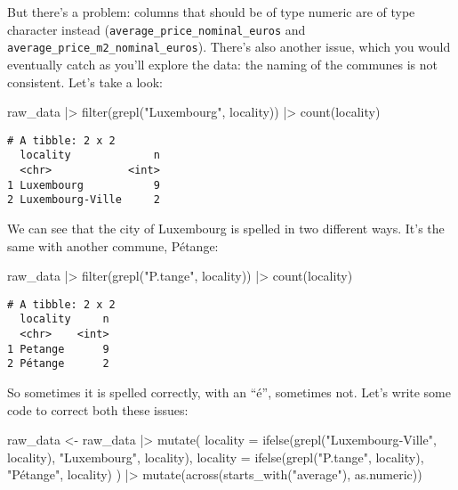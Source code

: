 \documentclass[
  letterpaper,
  DIV=11,
  numbers=noendperiod]{scrartcl}
\newenvironment{Shaded}{\begin{snugshade}}{\end{snugshade}}
\newcommand{\AttributeTok}[1]{\textcolor[rgb]{0.40,0.45,0.13}{#1}}
\newcommand{\FunctionTok}[1]{\textcolor[rgb]{0.28,0.35,0.67}{#1}}
\newcommand{\NormalTok}[1]{\textcolor[rgb]{0.00,0.23,0.31}{#1}}
\newcommand{\OtherTok}[1]{\textcolor[rgb]{0.00,0.23,0.31}{#1}}
\newcommand{\SpecialCharTok}[1]{\textcolor[rgb]{0.37,0.37,0.37}{#1}}
\newcommand{\StringTok}[1]{\textcolor[rgb]{0.13,0.47,0.30}{#1}}
\begin{document}
But there's a problem: columns that should be of type numeric are of
type character instead (\texttt{average\_price\_nominal\_euros} and
\texttt{average\_price\_m2\_nominal\_euros}). There's also another
issue, which you would eventually catch as you'll explore the data: the
naming of the communes is not consistent. Let's take a look:

\begin{Shaded}
\begin{Highlighting}[]
\NormalTok{raw\_data }\SpecialCharTok{|\textgreater{}}
  \FunctionTok{filter}\NormalTok{(}\FunctionTok{grepl}\NormalTok{(}\StringTok{"Luxembourg"}\NormalTok{, locality)) }\SpecialCharTok{|\textgreater{}}
  \FunctionTok{count}\NormalTok{(locality)}
\end{Highlighting}
\end{Shaded}

\begin{verbatim}
# A tibble: 2 x 2
  locality             n
  <chr>            <int>
1 Luxembourg           9
2 Luxembourg-Ville     2
\end{verbatim}

We can see that the city of Luxembourg is spelled in two different ways.
It's the same with another commune, Pétange:

\begin{Shaded}
\begin{Highlighting}[]
\NormalTok{raw\_data }\SpecialCharTok{|\textgreater{}}
  \FunctionTok{filter}\NormalTok{(}\FunctionTok{grepl}\NormalTok{(}\StringTok{"P.tange"}\NormalTok{, locality)) }\SpecialCharTok{|\textgreater{}}
  \FunctionTok{count}\NormalTok{(locality)}
\end{Highlighting}
\end{Shaded}

\begin{verbatim}
# A tibble: 2 x 2
  locality     n
  <chr>    <int>
1 Petange      9
2 Pétange      2
\end{verbatim}

So sometimes it is spelled correctly, with an ``é'', sometimes not.
Let's write some code to correct both these issues:

\begin{Shaded}
\begin{Highlighting}[]
\NormalTok{raw\_data }\OtherTok{\textless{}{-}}\NormalTok{ raw\_data }\SpecialCharTok{|\textgreater{}}
  \FunctionTok{mutate}\NormalTok{(}
    \AttributeTok{locality =} \FunctionTok{ifelse}\NormalTok{(}\FunctionTok{grepl}\NormalTok{(}\StringTok{"Luxembourg{-}Ville"}\NormalTok{, locality),}
                      \StringTok{"Luxembourg"}\NormalTok{,}
\NormalTok{                      locality),}
         \AttributeTok{locality =} \FunctionTok{ifelse}\NormalTok{(}\FunctionTok{grepl}\NormalTok{(}\StringTok{"P.tange"}\NormalTok{, locality),}
                           \StringTok{"Pétange"}\NormalTok{,}
\NormalTok{                           locality)}
\NormalTok{         ) }\SpecialCharTok{|\textgreater{}}
  \FunctionTok{mutate}\NormalTok{(}\FunctionTok{across}\NormalTok{(}\FunctionTok{starts\_with}\NormalTok{(}\StringTok{"average"}\NormalTok{),}
\NormalTok{         as.numeric))}
\end{Highlighting}
\end{Shaded}
\end{document}
